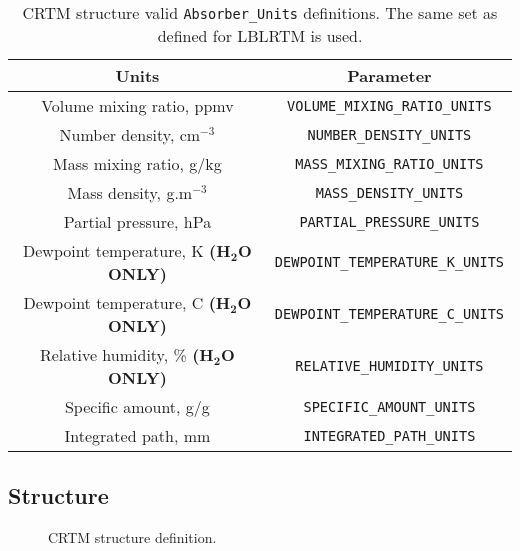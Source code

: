 \begin{table}
  \centering
  \begin{tabular}{|c|c|}
    \hline
    \sffamily\textbf{Units} & \sffamily\textbf{Parameter} \\
    \hline\hline
     Volume mixing ratio, ppmv                       & \texttt{VOLUME\_MIXING\_RATIO\_UNITS} \\
     Number density, cm$^{-3}$                       & \texttt{NUMBER\_DENSITY\_UNITS} \\
     Mass mixing ratio, g/kg                         & \texttt{MASS\_MIXING\_RATIO\_UNITS} \\
     Mass density, g.m$^{-3}$                        & \texttt{MASS\_DENSITY\_UNITS} \\
     Partial pressure, hPa                           & \texttt{PARTIAL\_PRESSURE\_UNITS} \\
     Dewpoint temperature, K  \textbf{(H$\mathbf{_2}$O ONLY)} & \texttt{DEWPOINT\_TEMPERATURE\_K\_UNITS} \\
     Dewpoint temperature, C  \textbf{(H$\mathbf{_2}$O ONLY)} & \texttt{DEWPOINT\_TEMPERATURE\_C\_UNITS} \\
     Relative humidity, \%    \textbf{(H$\mathbf{_2}$O ONLY)} & \texttt{RELATIVE\_HUMIDITY\_UNITS} \\
     Specific amount, g/g                            & \texttt{SPECIFIC\_AMOUNT\_UNITS} \\
     Integrated path, mm                             & \texttt{INTEGRATED\_PATH\_UNITS} \\
    \hline
  \end{tabular}
  \caption{CRTM \Atmosphere{} structure valid \texttt{Absorber\_Units} definitions. The same set as defined for LBLRTM is used.}
  \label{tab:absorber_units}
\end{table}

\subsection{\Cloud{} Structure}
\label{sec:cloud_structure}

\begin{figure}[htp]
  \centering
  \caption{CRTM \Cloud{} structure definition.}
  \label{fig:cloud_structure}
\end{figure}

